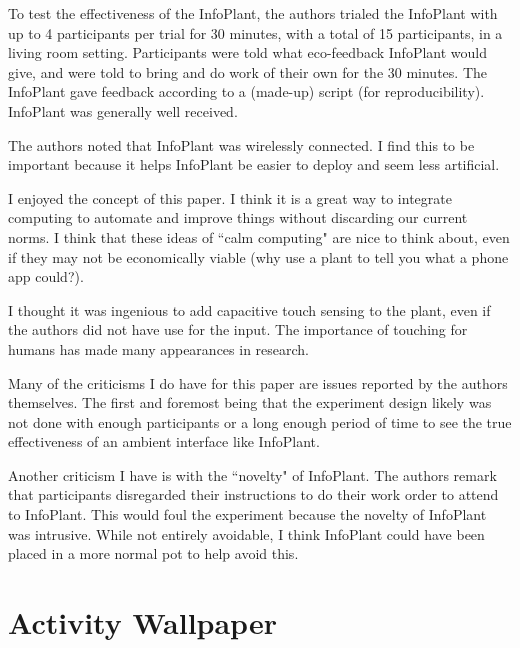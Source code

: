 \documentclass{article}
\begin{document}
To test the effectiveness of the InfoPlant, the authors trialed the InfoPlant with up to 4 participants per trial for 30 minutes, with a total of 15 participants, in a living room setting. Participants were told what eco-feedback InfoPlant would give, and were told to bring and do work of their own for the 30 minutes. The InfoPlant gave feedback according to a (made-up) script (for reproducibility). InfoPlant was generally well received.

The authors noted that InfoPlant was wirelessly connected. I find this to be important because it helps InfoPlant be easier to deploy and seem less artificial.

I enjoyed the concept of this paper. I think it is a great way to integrate computing to automate and improve things without discarding our current norms. I think that these ideas of ``calm computing" are nice to think about, even if they may not be economically viable (why use a plant to tell you what a phone app could?).

I thought it was ingenious to add capacitive touch sensing to the plant, even if the authors did not have use for the input. The importance of touching for humans has made many appearances in research.

Many of the criticisms I do have for this paper are issues reported by the authors themselves. The first and foremost being that the experiment design likely was not done with enough participants or a long enough period of time to see the true effectiveness of an ambient interface like InfoPlant.

Another criticism I have is with the ``novelty" of InfoPlant. The authors remark that participants disregarded their instructions to do their work order to attend to InfoPlant. This would foul the experiment because the novelty of InfoPlant was intrusive. While not entirely avoidable, I think InfoPlant could have been placed in a more normal pot to help avoid this. 

\section{Activity Wallpaper}
\end{document}
